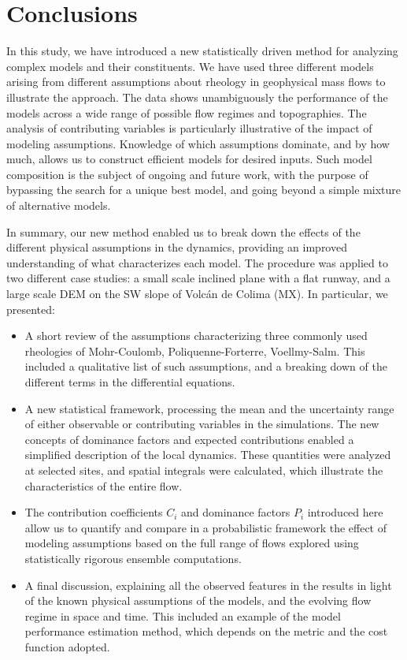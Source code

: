 \documentclass{article}
\begin{document}
\section{Conclusions}
In this study, we have introduced a new statistically driven method for analyzing complex models and their constituents. We have used three different models arising from different assumptions about rheology in geophysical mass flows to illustrate the approach. The data shows unambiguously the performance of the models across a wide range of possible flow regimes and topographies. The analysis of contributing variables is particularly illustrative of the impact of modeling assumptions. Knowledge of which assumptions dominate, and by how much, allows us to construct efficient models for desired inputs. Such model composition is the subject of ongoing and future work, with the purpose of bypassing the search for a unique best model, and going beyond a simple mixture of alternative models.

In summary, our new method enabled us to break down the effects of the different physical assumptions in the dynamics, providing an improved understanding of what characterizes each model. The procedure was applied to two different case studies: a small scale inclined plane with a flat runway, and a large scale DEM on the SW slope of Volc\'{a}n de Colima (MX). In particular, we presented:
\begin{itemize}
  \item A short review of the assumptions characterizing three commonly used rheologies of Mohr-Coulomb, Poliquenne-Forterre, Voellmy-Salm. This included a qualitative list of such assumptions, and a breaking down of the different terms in the differential equations.
  \item A new statistical framework, processing the mean and the uncertainty range of either observable or contributing variables in the simulations. The new concepts of dominance factors and expected contributions enabled a simplified description of the local dynamics. These quantities were analyzed at selected sites, and spatial integrals were calculated, which illustrate the characteristics of the entire flow.
  \item The contribution  coefficients $C_i$ and dominance factors $P_i$  introduced here allow us to quantify and compare in a probabilistic framework the effect of modeling assumptions based on the full range of flows explored using statistically rigorous ensemble computations.
  \item A final discussion, explaining all the observed features in the results in light of the known physical assumptions of the models, and the evolving flow regime in space and time. This included an example of the model performance estimation method, which depends on the metric and the cost function adopted.
\end{itemize}
\end{document}
